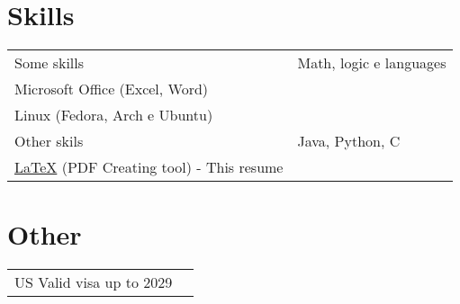 \documentclass[a4paper,12pt]{article}
\begin{document}
\section{Skills}
\begin{tabularx}{\linewidth}{@{}l X@{}}
Some skills &  \normalsize{Math, logic e languages}\\
\normalsize{Microsoft Office (Excel, Word)}\\ 
\normalsize{Linux (Fedora, Arch e Ubuntu)}  \\
Other skils  &  \normalsize{ Java, Python, C}\\ 
\href{https://www.latex-project.org/}{\LaTeX} (PDF Creating tool) - This resume
\end{tabularx}
\section{Other}
\begin{tabularx}{\linewidth}{@{}l X@{}}
    {US Valid visa up to 2029}
\end{tabularx}
\vfill
{}
\end{document}
